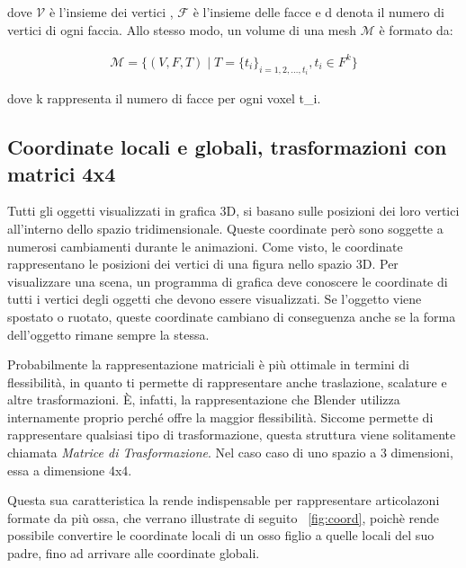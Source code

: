 dove \(\mathcal{V}\) è l'insieme dei vertici , \(\mathcal{F}\) è l'insieme delle facce e d denota il numero di vertici di ogni faccia. Allo stesso modo, un volume di una mesh \(\mathcal{M}\) è formato da:

\begin{align*}
    \mathcal{M} = \{ (V,F,T) \mid
    T = \{ t_i \}_{i=1,2,\dots,t_i}, t_i \in F^k \}
\end{align*}

dove k rappresenta il numero di facce per ogni voxel t_i.

\subsection{Coordinate locali e globali, trasformazioni con matrici 4x4}
Tutti gli oggetti visualizzati in grafica 3D, si basano sulle posizioni dei loro vertici all'interno dello spazio tridimensionale. Queste coordinate però sono soggette a numerosi cambiamenti durante le animazioni.
Come visto, le coordinate rappresentano le posizioni dei vertici di una figura nello spazio 3D. Per visualizzare una scena, un programma di grafica deve conoscere le coordinate di tutti i vertici degli oggetti che devono essere visualizzati. Se l'oggetto viene spostato o ruotato, queste coordinate cambiano di conseguenza anche se la forma dell'oggetto rimane sempre la stessa.

Probabilmente la rappresentazione matriciali è più ottimale in termini di flessibilità, in quanto ti permette di rappresentare anche traslazione, scalature e altre trasformazioni. È, infatti, la rappresentazione che Blender utilizza internamente  proprio perché offre la maggior flessibilità. Siccome permette di rappresentare qualsiasi tipo di trasformazione, questa struttura viene solitamente chiamata \textit{Matrice di Trasformazione}. Nel caso caso di uno spazio a 3 dimensioni, essa a dimensione 4x4.~\cite{tec:2018}

Questa sua caratteristica la rende indispensable per rappresentare articolazoni formate da più ossa, che verrano illustrate di seguito ~\ref{fig:coord}, poichè rende possibile convertire le coordinate locali di un osso figlio a quelle locali del suo padre, fino ad arrivare alle coordinate globali.

